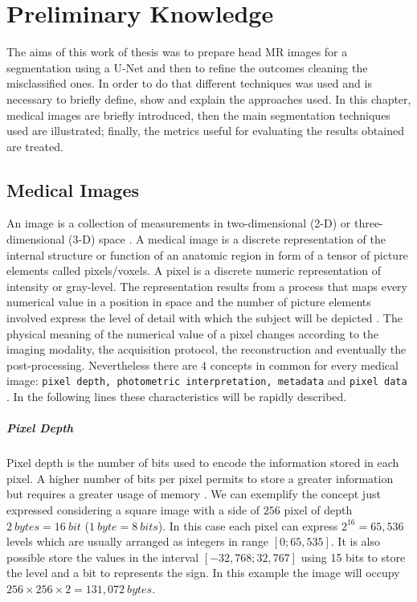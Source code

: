 \documentclass{standalone}
\begin{document}
\chapter{Preliminary Knowledge}\label{CAP:theory}

The aims of this work of thesis was to prepare head MR images for a segmentation using a U-Net and then to refine the outcomes cleaning the misclassified ones.
In order to do that different techniques was used and is necessary to briefly define, show and explain the approaches used.
In this chapter, medical images are briefly introduced, then the main segmentation techniques used are illustrated; finally, the metrics useful for evaluating the results obtained are treated.



\section{Medical Images}
An image is a collection of measurements in two-dimensional (2-D) or three-dimensional (3-D) space \cite{ART:Pham}.
A medical image is a discrete representation of the internal structure or function of an anatomic region in form of a tensor of picture elements called pixels/voxels. A pixel is a discrete numeric representation of intensity or gray-level\cite{mastersthesis:Filitto}. The representation results from a process that maps every numerical value in a position in space and the number of picture elements involved express the level of detail with which the subject will be depicted \cite{mastersthesis:Biondi}.
The physical meaning of the numerical value of a pixel changes according to the imaging modality, the acquisition protocol, the reconstruction and eventually the post-processing.
Nevertheless there are 4 concepts in common for every medical image: \texttt{pixel depth, photometric interpretation, metadata} and \texttt{pixel data} \cite{ART:Larobina}.
In the following lines these characteristics will be rapidly described.

\paragraph{Pixel Depth}
Pixel depth is the number of bits used to encode the information stored in each pixel. A higher number of bits per pixel permits to store a greater information but requires a greater usage of memory \cite{ART:Larobina}.
We can exemplify the concept just expressed considering a square image with a side of $256$ pixel of depth $2 \ bytes = 16 \ bit$ ($1 \ byte = 8 \ bits$). In this case each pixel can express $2^{16} = 65,536$ levels which are usually arranged as integers in range $[0; 65,535]$. It is also possible store the values in the interval $[ -32,768; 32,767] $ using 15 bits to store the level and a bit to represents the sign. In this example the image will occupy $256 \times 256 \times 2 = 131,072 \ bytes$.
\end{document}
